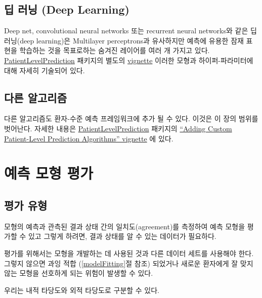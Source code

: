 \documentclass[11pt]{book}
\theoremstyle{definition}
\theoremstyle{definition}
\theoremstyle{definition}
\theoremstyle{remark}
\let\BeginKnitrBlock\begin \let\EndKnitrBlock\end
\begin{document}
\subsection{딥 러닝 (Deep Learning)}\label{--deep-learning}

Deep net, convolutional neural networks 또는 recurrent neural networks와
같은 딥 러닝(deep learning)은 Multilayer perceptrons과 유사하지만 예측에
유용한 잠재 표현을 학습하는 것을 목표로하는 숨겨진 레이어를 여러 개
가지고 있다.
\href{https://ohdsi.github.io/PatientLevelPrediction/}{PatientLevelPrediction}
패키지의 별도의
\href{https://ohdsi.github.io/PatientLevelPrediction/articles/BuildingDeepLearningModels.html}{vignette}
이러한 모형과 하이퍼-파라미터에 대해 자세히 기술되어
있다. 

\subsection{다른 알고리즘}\label{-}

다른 알고리즘도 환자-수준 예측 프레임워크에 추가 될 수 있다. 이것은 이
장의 범위를 벗어난다. 자세한 내용은
\href{https://ohdsi.github.io/PatientLevelPrediction/}{PatientLevelPrediction}
패키지의
\href{https://ohdsi.github.io/PatientLevelPrediction/articles/AddingCustomAlgorithms.html}{``Adding
Custom Patient-Level Prediction Algorithms'' vignette} 에 있다.

\section{예측 모형 평가}\label{--}

\subsection{평가 유형}\label{-}

모형의 예측과 관측된 결과 상태 간의 일치도(agreement)를 측정하여 예측
모형을 평가할 수 있고 그렇게 하려면, 결과 상태를 알 수 있는 데이터가
필요하다. 

\BeginKnitrBlock{rmdimportant}
평가를 위해서는 모형을 개발하는 데 사용된 것과 다른 데이터 세트를
사용해야 한다. 그렇지 않으면 과잉 적합 (\ref{modelFitting}절 참조)
되었거나 새로운 환자에게 잘 맞지 않는 모형을 선호하게 되는 위험이 발생할
수 있다.
\EndKnitrBlock{rmdimportant}

우리는 내적 타당도와 외적 타당도로 구분할 수 있다.
\end{document}

